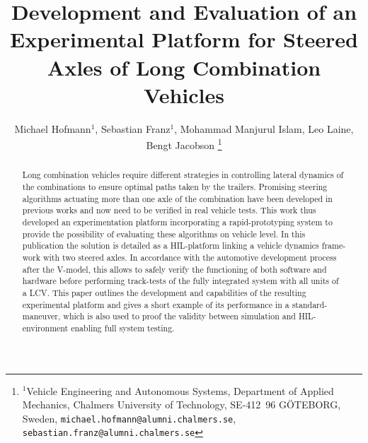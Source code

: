 \documentclass[letterpaper, 10pt, conference]{IEEEconf}      %
\title{\LARGE \bf
Development and Evaluation of an Experimental Platform for Steered Axles of Long Combination Vehicles}
\author{Michael Hofmann$^{1}$, Sebastian Franz$^{1}$, Mohammad Manjurul Islam, Leo Laine, Bengt Jacobson%
	\thanks{$^{1}$Vehicle Engineering and Autonomous Systems, Department of Applied Mechanics, Chalmers University of Technology, SE-412~96 G\"OTEBORG, Sweden,
		{\tt\small michael.hofmann@alumni.chalmers.se},
		{\tt\small sebastian.franz@alumni.chalmers.se}}%
}
\begin{document}
\maketitle
\thispagestyle{empty}
\pagestyle{empty}


\begin{abstract}

	Long combination vehicles require different strategies in controlling lateral dynamics of the combinations to ensure optimal paths taken by the trailers. Promising steering algorithms actuating more than one axle of the combination have been developed in previous works and now need to be verified in real vehicle tests. This work thus developed an experimentation platform incorporating a rapid-prototyping system to provide the possibility of evaluating these algorithms on vehicle level. In this publication the solution is detailed as a \gls{HIL}-platform linking a vehicle dynamics frame-work with two steered axles. In accordance with the automotive development process after the V-model, this allows to safely verify the functioning of both software and hardware before performing track-tests of the fully integrated system with all units of a \gls{LCV}. This paper outlines the development and capabilities of the resulting experimental platform and gives a short example of its performance in a standard-maneuver, which is also used to proof the validity between simulation and \gls{HIL}-environment enabling full system testing.

\end{abstract}








%



%





\addtolength{\textheight}{-12cm}   %
\end{document}
